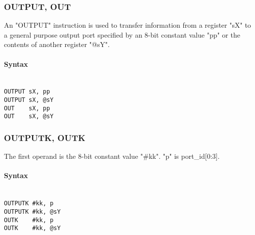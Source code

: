         \subsubsection{OUTPUT, OUT}
            An "OUTPUT" instruction is used to transfer information from a register "sX" to a general purpose output port specified by an 8-bit constant value "pp" or the
            contents of another register "@sY".

            \paragraph{Syntax}
                ~\\
                \verb'OUTPUT sX, pp'\\
                \verb'OUTPUT sX, @sY'\\
                \verb'OUT    sX, pp'\\
                \verb'OUT    sX, @sY'

        \subsubsection{OUTPUTK, OUTK}
            The first operand is the 8-bit constant value "\#kk". "p" is port\_id[0:3].

            \paragraph{Syntax}
                ~\\
                \verb'OUTPUTK #kk, p'\\
                \verb'OUTPUTK #kk, @sY'\\
                \verb'OUTK    #kk, p'\\
                \verb'OUTK    #kk, @sY'
